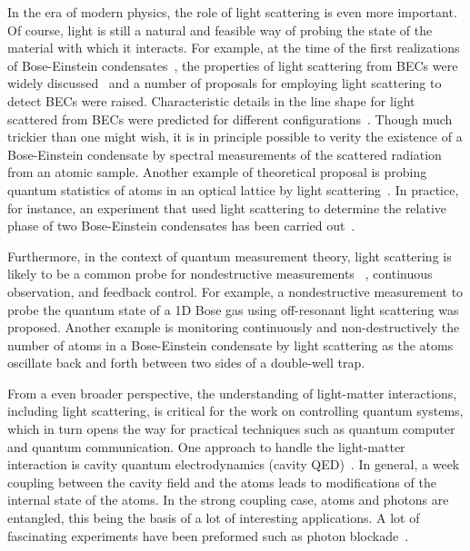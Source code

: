 
In the era of modern physics, the role of light scattering is even more important. Of course, light is still a natural and feasible way of probing the state of the material with which it interacts. For example, at the time of the first realizations of Bose-Einstein condensates~\cite{Anderson14071995,PhysRevLett.75.3969}, the properties of light scattering from BECs were widely discussed~\cite{PhysRevA.43.6444,PhysRevA.51.3896,PhysRevA.52.3033,PhysRevLett.71.1339}  and a number of proposals for employing light scattering to detect BECs were raised. Characteristic details in the line shape for light scattered from BECs were predicted for different configurations~\cite{PhysRevLett.72.2375,PhysRevA.50.R3565,PhysRevLett.75.1927,PhysRevLett.76.1774,PhysRevA.54.R2543}. Though much trickier than one might wish, it is in principle possible to verity the existence of a Bose-Einstein condensate by spectral measurements of the scattered radiation from an atomic sample. Another example of theoretical proposal is probing quantum statistics of atoms in an optical lattice by light scattering~\cite{PhysRevA.76.053618}. In practice, for instance, an experiment that used light scattering to determine the relative phase of two Bose-Einstein condensates has been carried out~\cite{Saba25032005}.

Furthermore, in the context of quantum measurement theory, light scattering is likely to be a common probe for nondestructive measurements~\cite{RevModPhys.68.1} , continuous observation, and feedback control. For example, a nondestructive measurement to probe the quantum state of a 1D Bose gas using off-resonant light scattering was proposed\cite{PhysRevLett.107.270403}. Another example is monitoring continuously and non-destructively the number of atoms in a Bose-Einstein condensate by light scattering as the atoms oscillate back and forth between two sides of a double-well trap\cite{NJP.JJ}.

From a even broader perspective, the understanding of light-matter interactions, including light scattering, is critical for the work on controlling quantum systems, which in turn opens the way for practical techniques such as quantum computer and quantum communication. One approach to handle the light-matter interaction is cavity quantum electrodynamics (cavity QED)~\cite{0034-4885-69-5-R02}. In general, a week coupling between the cavity field and the atoms leads to modifications of the internal state of the atoms. In the strong coupling case, atoms and photons are entangled, this being the basis of a lot of interesting applications. A lot of fascinating experiments have been preformed such as photon blockade~\cite{photon_blockade}.

